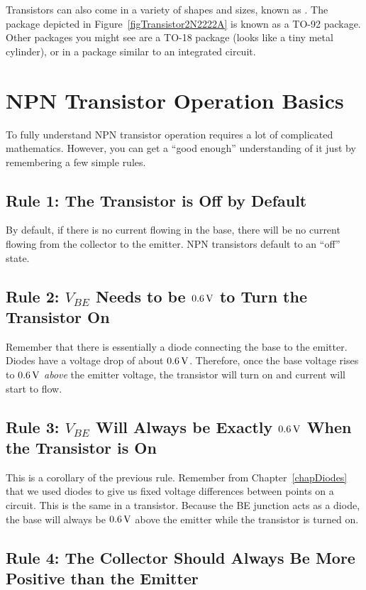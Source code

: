 Transistors can also come in a variety of shapes and sizes, known as .
The package depicted in Figure~\ref{figTransistor2N2222A} is known as a TO-92 package.
Other packages you might see are a TO-18 package (looks like a tiny metal cylinder), or in a package similar to an integrated circuit.

\section{NPN Transistor Operation Basics}

To fully understand NPN transistor operation requires a lot of complicated mathematics.
However, you can get a ``good enough'' understanding of it just by remembering a few simple rules.

\subsection*{Rule 1: The Transistor is Off by Default}

By default, if there is no current flowing in the base, there will be no current flowing from the collector to the emitter.
NPN transistors default to an ``off'' state.

\subsection*{Rule 2: $V_{BE}$ Needs to be $0.6\,\si{\volt}$ to Turn the Transistor On}

Remember that there is essentially a diode connecting the base to the emitter.
Diodes have a voltage drop of about $0.6\,\si{\volt}$.  
Therefore, once the base voltage rises to $0.6\,\si{\volt}$ \emph{above} the emitter voltage, the transistor will turn on and current will start to flow.

\subsection*{Rule 3: $V_{BE}$ Will Always be Exactly $0.6\,\si{\volt}$ When the Transistor is On}

This is a corollary of the previous rule.
Remember from Chapter~\ref{chapDiodes} that we used diodes to give us fixed voltage differences between points on a circuit.
This is the same in a transistor.
Because the BE junction acts as a diode, the base will always be $0.6\,\si{\volt}$ above the emitter while the transistor is turned on.

\subsection*{Rule 4: The Collector Should Always Be More Positive than the Emitter}

